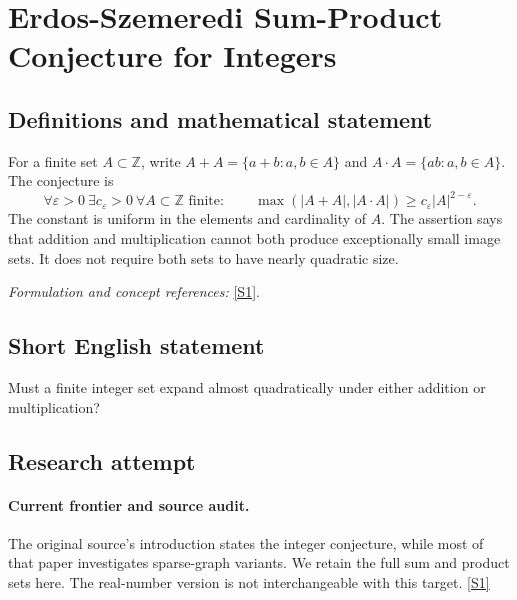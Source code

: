 \documentclass[11pt,a4paper]{article}
\newcommand{\Z}{\mathbb{Z}}
\newcommand{\sref}[2]{\hyperlink{source:#1:#2}{[S#2]}}
\newif\ifshowcatalogue
\newcommand{\cataloguescope}[1]{\ifshowcatalogue
 \paragraph{Exact scope in the supplied catalogue.}
 \begin{quote}\small #1\end{quote}\fi}
\numberwithin{equation}{section}
\begin{document}
\setcounter{section}{112}
\clearpage
\section{\texorpdfstring{Erdos-Szemeredi Sum-Product Conjecture for Integers}{Erdos-Szemeredi Sum-Product Conjecture for Integers}}\label{113}
\subsection{Definitions and mathematical statement}
For a finite set $A\subset\Z$, write $A+A=\{a+b:a,b\in A\}$ and $A\cdot A=\{ab:a,b\in A\}$. The conjecture is
\[
 \forall\varepsilon>0\ \exists c_\varepsilon>0\ \forall A\subset\Z\text{ finite}:\qquad
 \max(|A+A|,|A\cdot A|)\ge c_\varepsilon|A|^{2-\varepsilon}.
\]
The constant is uniform in the elements and cardinality of $A$. The assertion says that addition and multiplication cannot both produce exceptionally small image sets. It does not require both sets to have nearly quadratic size.
\par\smallskip\textit{Formulation and concept references:} \sref{113}{1}.
\cataloguescope{Prove that for every epsilon greater than zero there is a constant c\_epsilon greater than zero such that every finite set A of integers satisfies max(|A+A|, |A*A|) at least c\_epsilon times |A|\textasciicircum{}(2-epsilon).}
\subsection{Short English statement}
Must a finite integer set expand almost quadratically under either addition or multiplication?
\subsection{Research attempt}

\paragraph{Current frontier and source audit.}
The original source's introduction states the integer conjecture, while
most of that paper investigates sparse-graph variants. We retain the full
sum and product sets here. The real-number version is not interchangeable
with this target. \sref{113}{1}
\end{document}
